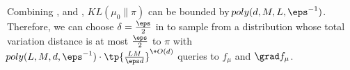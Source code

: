 Combining ,  and , $\!{KL}(\mu_0\|\pi)$ can be bounded by $\!{poly}(d,M,L,\eps^{-1})$. Therefore, we can choose $\delta = \frac{\eps}{2}$ in  to sample from a distribution whose total variation distance is at most $\frac{\eps}{2}$ to $\pi$ with $\!{poly}(L,M, d,\eps^{-1})\cdot \tp{\frac{LM}{\eps d}}^{\+O(d)}$ queries to $f_\mu$ and $\grad f_{\mu}$.








